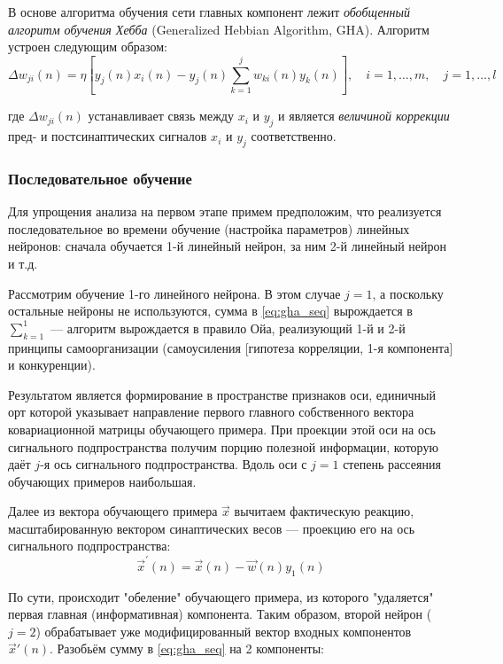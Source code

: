 \documentclass{article}
\numberwithin{equation}{subsection}
\begin{document}
В основе алгоритма обучения сети главных компонент лежит \textit{обобщенный алгоритм обучения Хебба} 
(Generalized Hebbian Algorithm, GHA).
Алгоритм устроен следующим образом:
\begin{equation}
    \Delta w _{ji}(n) = \eta 
    \left[
        y_j(n) x_i(n) - y_j(n) \sum_{k=1}^j w_{ki}(n) y_k(n) 
    \right], \quad i = 1, \dots, m,\quad j=1, \dots, l
    \label{eq:gha_seq}
\end{equation}

\noindent
где $\Delta w_{ji}(n)$ устанавливает связь между $x_i$ и $y_j$ и является \textit{величиной коррекции}
пред- и постсинаптических сигналов $x_i$ и $y_j$ соответственно.




\subsubsection{Последовательное обучение}

Для упрощения анализа на первом этапе примем предположим, что реализуется последовательное
во времени обучение (настройка параметров) линейных нейронов: сначала обучается 1-й линейный нейрон,
за ним 2-й линейный нейрон и т.д.

Рассмотрим обучение 1-го линейного нейрона. В этом случае $j=1$, а поскольку остальные нейроны
не используются, сумма в \ref{eq:gha_seq} вырождается в $\sum_{k=1}^1$ --- алгоритм вырождается 
в правило Ойа, реализующий 1-й и 2-й принципы самоорганизации (самоусиления [гипотеза корреляции, 
1-я компонента] и конкуренции).

Результатом является формирование в пространстве признаков оси, единичный орт которой указывает
направление первого главного собственного вектора ковариационной матрицы обучающего примера. 
При проекции этой оси на ось сигнального подпространства получим порцию полезной информации, 
которую даёт $j$-я ось сигнального подпространства.
Вдоль оси с $j=1$ степень рассеяния обучающих примеров наибольшая.

Далее из вектора обучающего примера $\vec{x}$ вычитаем фактическую реакцию, масштабированную вектором
синаптических весов --- проекцию его на ось сигнального подпространства:
\begin{equation}
    \vec{x}^\prime(n) = \vec{x}(n) - \vec{w}(n) y_1(n)
    \label{eq:first_main_comp}
\end{equation}

По сути, происходит "обеление" обучающего примера, из которого "удаляется" первая главная 
(информативная) компонента. Таким образом, второй нейрон ($j=2$) обрабатывает уже 
модифицированный вектор входных компонентов $\vec{x}'(n)$.
Разобьём сумму в \ref{eq:gha_seq} на 2 компоненты:
\end{document}
